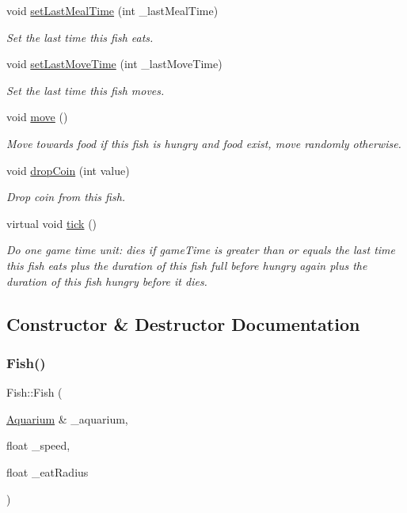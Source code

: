 \begin{DoxyCompactItemize}
void \mbox{\hyperlink{class_fish_a1f7311b9420fb5024765db52bcdb6cf3}{set\+Last\+Meal\+Time}} (int \+\_\+last\+Meal\+Time)
\begin{DoxyCompactList}\small\item\em Set the last time this fish eats. \end{DoxyCompactList}\item 
void \mbox{\hyperlink{class_fish_a49b56a52b365b3b492e519e4b27bc441}{set\+Last\+Move\+Time}} (int \+\_\+last\+Move\+Time)
\begin{DoxyCompactList}\small\item\em Set the last time this fish moves. \end{DoxyCompactList}\item 
void \mbox{\hyperlink{class_fish_a1a18368573aab3b14a83aaf2424630ec}{move}} ()
\begin{DoxyCompactList}\small\item\em Move towards food if this fish is hungry and food exist, move randomly otherwise. \end{DoxyCompactList}\item 
void \mbox{\hyperlink{class_fish_add7c1e5a1f01384f3e5d919d880941bd}{drop\+Coin}} (int value)
\begin{DoxyCompactList}\small\item\em Drop coin from this fish. \end{DoxyCompactList}\item 
virtual void \mbox{\hyperlink{class_fish_aa49a70677a400c471b1e3db5d8f1881e}{tick}} ()
\begin{DoxyCompactList}\small\item\em Do one game time unit\+: dies if game\+Time is greater than or equals the last time this fish eats plus the duration of this fish full before hungry again plus the duration of this fish hungry before it dies. \end{DoxyCompactList}\end{DoxyCompactItemize}


\subsection{Constructor \& Destructor Documentation}
\mbox{\label{class_fish_aede64f7ce29fcda26276bb24a5aa509d}} 
\subsubsection{\texorpdfstring{Fish()}{Fish()}}
{\footnotesize\ttfamily Fish\+::\+Fish (\begin{DoxyParamCaption}\item[{\mbox{\hyperlink{class_aquarium}{Aquarium}} \&}]{\+\_\+aquarium,  }\item[{float}]{\+\_\+speed,  }\item[{float}]{\+\_\+eat\+Radius }\end{DoxyParamCaption})}



